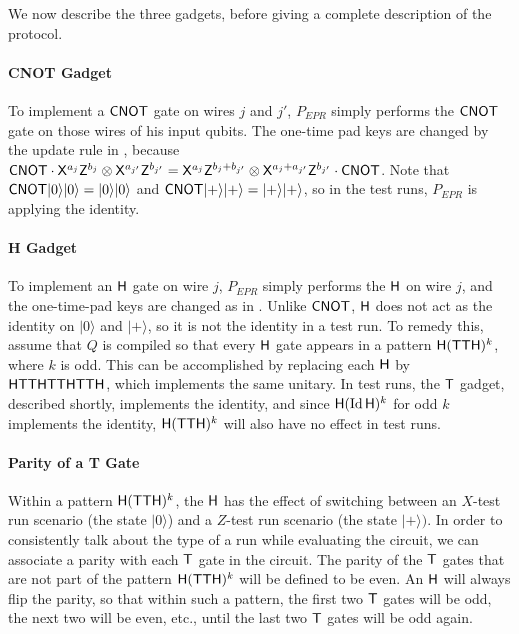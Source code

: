 \documentclass{toc}
\newcommand{\ket}[1]{|#1\rangle}
\newcommand{\Id}{\ensuremath{\mathop{\rm Id}\nolimits}}
\begin{document}
We now describe the three gadgets, before giving a complete description of the protocol. 

\paragraph{CNOT Gadget} To implement a $\sf CNOT$ gate on wires $j$ and $j'$, $P_{EPR}$ simply performs the $\sf CNOT$ gate on those wires of his input qubits. The one-time pad keys are changed by the update rule in , because ${\sf CNOT}\cdot {\sf X}^{a_j}{\sf Z}^{b_j}\otimes {\sf X}^{a_{j'}}{\sf Z}^{b_{j'}}={\sf X}^{a_j}{\sf Z}^{b_j+b_{j'}}\otimes {\sf X}^{a_j+a_{j'}}{\sf Z}^{b_{j'}}\cdot {\sf CNOT}$. Note that ${\sf CNOT}\ket{0}\ket{0}=\ket{0}\ket{0}$ and ${\sf CNOT}\ket{+}\ket{+}=\ket{+}\ket{+}$, so in the test runs, $P_{EPR}$ is applying the identity. 



\paragraph{H Gadget} To implement an $\sf H$ gate on wire $j$, $P_{EPR}$ simply performs the $\sf H$ on wire $j$, and the one-time-pad keys are changed as in . Unlike $\sf CNOT$, $\sf H$ does not act as the identity on $\ket{0}$ and $\ket{+}$, so it is not the identity in a test run. To remedy this, assume that $Q$ is compiled so that every $\sf H$ gate appears in a pattern ${\sf H}({\sf TTH})^k$, where $k$ is odd. This can be accomplished by replacing each $\sf H$ by $\sf HTTHTTHTTH$, which implements the same unitary. In test runs, the $\sf T$ gadget, described shortly, implements the identity, and since ${\sf H}(\Id {\sf H})^k$ for odd $k$ implements the identity, ${\sf H}({\sf TTH})^k$ will also have no effect in test runs. 

\paragraph{Parity of a T Gate} Within a pattern ${\sf H}({\sf TTH})^k$, the $\sf H$ has the effect of switching between an $X$-test run scenario (the state $\ket{0}$) and a $Z$-test run scenario (the state $\ket{+})$. In order to consistently talk about the type of a run while evaluating the circuit, we can associate a parity with each $\sf T$ gate in the circuit. The parity of the $\sf T$ gates that are not part of the pattern ${\sf H}({\sf TTH})^k$ will be defined to be even. An ${\sf H}$ will always flip the parity, so that within such a pattern, the first two ${\sf T}$ gates will be odd, the next two will be even, etc., until the last two $\sf T$ gates will be odd again. 
\end{document}
